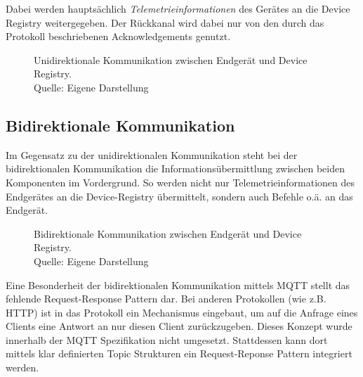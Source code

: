 Dabei werden hauptsächlich \textit{Telemetrieinformationen} des Gerätes an die Device Registry weitergegeben. Der Rückkanal wird dabei nur von den durch das Protokoll beschriebenen Acknowledgements genutzt.

\begin{figure}[h]
    \centering
    \caption[Unidirektionale Kommunikation]{Unidirektionale Kommunikation zwischen Endgerät und Device Registry.\\Quelle: Eigene Darstellung}
\end{figure}

\subsection*{Bidirektionale Kommunikation}
Im Gegensatz zu der unidirektionalen Kommunikation steht bei der bidirektionalen Kommunikation die Informationsübermittlung zwischen beiden Komponenten im Vordergrund. So werden nicht nur Telemetrieinformationen des Endgerätes an die Device-Registry übermittelt, sondern auch Befehle o.ä. an das Endgerät.

\begin{figure}[h]
    \centering
    \caption[Bidirektionale Kommunikation]{Bidirektionale Kommunikation zwischen Endgerät und Device Registry.\\Quelle: Eigene Darstellung}
\end{figure}

Eine Besonderheit der bidirektionalen Kommunikation mittels \ac{MQTT} stellt das fehlende Request-Response Pattern dar. Bei anderen Protokollen (wie z.B. HTTP) ist in das Protokoll ein Mechanismus eingebaut, um auf die Anfrage eines Clients eine Antwort an nur diesen Client zurückzugeben. Dieses Konzept wurde innerhalb der MQTT Spezifikation nicht umgesetzt. Stattdessen kann dort mittels klar definierten Topic Strukturen ein Request-Reponse Pattern integriert werden.

